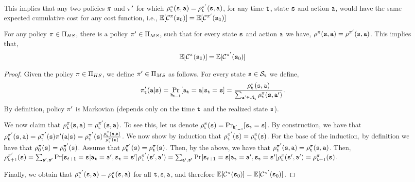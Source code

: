 This implies that any two policies $\pi$ and $\pi'$ for
which
$\rho^\pi_{\tt t}({\tt s},{\tt a})=\rho^{\pi'}_{\tt t}({\tt s},{\tt a})$,
for any time ${\tt t}$, state ${\tt s}$ and action ${\tt a}$, would
have the same expected cumulative cost for any cost function, i.e.,
$\mathbb{E}[\mathcal{C}^\pi({\tt s}_0)]=\mathbb{E}[\mathcal{C}^{\pi'}({\tt s}_0)]$



\begin{theorem}
\label{chp2:HS-MS}
For any policy $\pi\in \Pi_{HS}$, there is a policy
$\pi'\in\Pi_{MS}$, such that for every state ${\tt s}$ and action
${\tt a}$ we have,
$\rho^{\pi}({\tt s},{\tt a})=\rho^{\pi'}({\tt s},{\tt a})$.
This implies that,
\[
\mathbb{E}[\mathcal{C}^\pi({\tt s}_0)]=\mathbb{E}[\mathcal{C}^{\pi'}({\tt s}_0)]
\]
\end{theorem}

\begin{proof}
Given the policy  $\pi\in \Pi_{HS}$, we define
$\pi'\in\Pi_{MS}$ as follows. For every state ${\tt s}\in
\mathcal{S}_{\tt t}$ we define,
\[
\pi'_{\tt t}({\tt a}|{\tt s})=\Pr_{{\tt h}_{{\tt t}-1}}
[{\tt a}_{\tt t}={\tt a}|{\tt s}_{\tt t}={\tt s}]=\frac{\rho^\pi_{\tt t}({\tt s},{\tt a})}{\sum_{{\tt a}'\in
\mathcal{A}_{\tt t}} \rho^\pi_{\tt t}({\tt s},{\tt a}')}.
\]
By definition, policy $\pi'$ is Markovian (depends only on the time
${\tt t}$ and the realized state ${\tt s}$). 

We now claim that $\rho_{\tt t}^{\pi}({\tt s},{\tt a})=\rho_{\tt t}^{\pi'}({\tt s},{\tt a})$. 
To see this, let us denote $\rho^\pi_{\tt t}({\tt s})=\Pr_{{\tt h}'_{{\tt t}-1}}
[{\tt s}_{\tt t}={\tt s}]$. By construction, we have that
$\rho_{\tt t}^{\pi'}({\tt s},{\tt a}) = \rho_{\tt t}^{\pi'}({\tt s})\pi'({\tt a}|{\tt s}) = \rho_{\tt t}^{\pi'}({\tt s}) \frac{\rho_{\tt t}^{\pi}({\tt s},{\tt a})}{\rho_{\tt t}^{\pi}({\tt s})}$. 
We now show by induction that $\rho_{\tt t}^{\pi'}({\tt s}) = {\rho_{\tt t}^{\pi}({\tt s})}$. 
For the base of the induction, by definition we have that $\rho_0^{\pi}({\tt s})=\rho_0^{\pi'}({\tt s})$. Assume that $\rho_{\tt t}^{\pi'}({\tt s}) = {\rho_{\tt t}^{\pi}({\tt s})}$. Then, by the above, we have that $\rho_{\tt t}^{\pi'}({\tt s},{\tt a})=\rho_{\tt t}^{\pi}({\tt s},{\tt a})$. Then, $\rho_{{\tt t}+1}^{\pi'}({\tt s})=\sum_{{\tt a}',{\tt s}'} \Pr
[{\tt s}_{t+1}={\tt s}|{\tt a}_{\tt t}={\tt a}',{\tt s}_{\tt t}={\tt s}']\rho_{\tt t}^{\pi'}({\tt s}',{\tt a}')=\sum_{{\tt a}',{\tt s}'} \Pr
[{\tt s}_{t+1}={\tt s}|{\tt a}_{\tt t}={\tt a}',{\tt s}_{\tt t}={\tt s}']\rho_{\tt t}^{\pi}({\tt s}',{\tt a}')=\rho_{{\tt t}+1}^{\pi}({\tt s})$.

Finally, we obtain that $\rho_{\tt t}^{\pi'}({\tt s},{\tt a}) = \rho_{\tt t}^{\pi}({\tt s},{\tt a})$ for all ${\tt t},{\tt s},{\tt a}$, and therefore
$\mathbb{E}[\mathcal{C}^\pi({\tt s}_0)]=\mathbb{E}[\mathcal{C}^{\pi'}({\tt s}_0)]$.
\end{proof}

